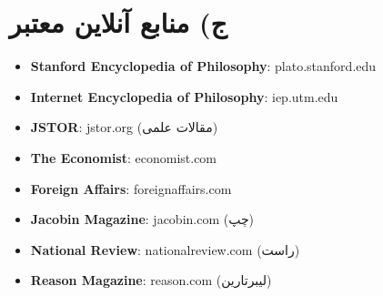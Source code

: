 \section*{ج) منابع آنلاین معتبر}

\begin{itemize}[rightmargin=2cm]
    \item \textbf{Stanford Encyclopedia of Philosophy}: plato.stanford.edu
    \item \textbf{Internet Encyclopedia of Philosophy}: iep.utm.edu
    \item \textbf{JSTOR}: jstor.org (مقالات علمی)
    \item \textbf{The Economist}: economist.com
    \item \textbf{Foreign Affairs}: foreignaffairs.com
    \item \textbf{Jacobin Magazine}: jacobin.com (چپ)
    \item \textbf{National Review}: nationalreview.com (راست)
    \item \textbf{Reason Magazine}: reason.com (لیبرتارین)
\end{itemize}